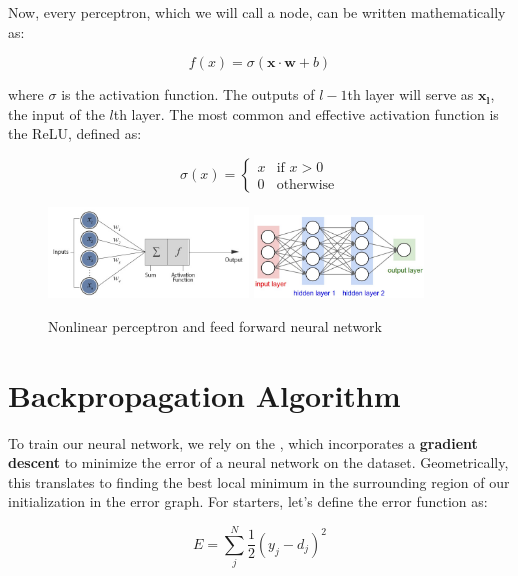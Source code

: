 \documentclass{article}
\let\vec\mathbf
\begin{document}
Now, every perceptron, which we will call a node, can be written mathematically as:

$$ f(x) = \sigma(\vec{x} \cdot \vec{w} + b) $$ 

where $\sigma$ is the activation function. The outputs of $l-1$th layer will serve as $\vec{x_l}$, the input of the $l$th layer. The most common and effective activation function is the ReLU, defined as:

\[
\sigma(x) = 
\begin{cases}
    x & \text{if } x > 0 \\
    0 & \text{otherwise}
\end{cases} 
\]

\begin{figure}[H]
    \begin{center}
        \includegraphics[width=0.475\textwidth]{nnclose.jpg}
        \hspace{15pt}
        \includegraphics[width=0.4\textwidth]{ffnn.jpg}
    \end{center}
    \vspace{-10pt}
    \caption{Nonlinear perceptron and feed forward neural network}
\end{figure}

\section{Backpropagation Algorithm}
To train our neural network, we rely on the , which incorporates a \textbf{gradient descent} to minimize the error of a neural network on the dataset. Geometrically, this translates to finding the best local minimum in the surrounding region of our initialization in the error graph. For starters, let's define the error function as:

$$ E = \sum_{j}^{N}\frac{1}{2}(y_j-d_j)^2$$
\end{document}
